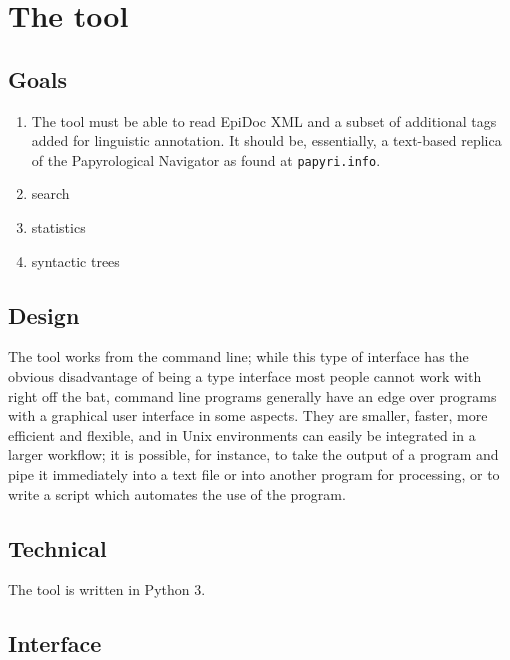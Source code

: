 \chapter{The tool}
\label{chp:design}
\minitoc\mtcskip
\section{Goals} %
\label{sec:tool-goals}


\begin{enumerate} 
  \item The tool must be able to read EpiDoc XML and a subset of
      additional tags added for linguistic annotation. It should be,
      essentially, a text-based replica of the Papyrological Navigator as found
      at \texttt{papyri.info}. 
    \item search 
    \item statistics
    \item syntactic trees
\end{enumerate}

\section{Design} %

The tool works from the command line; while this type of interface has the
obvious disadvantage of being a type interface most people cannot work with
right off the bat, command line programs generally have an edge over programs
with a graphical user interface in some aspects. They are smaller, faster, more
efficient and flexible, and in Unix environments can easily be integrated in a
larger workflow; it is possible, for instance, to take the output of a program
and pipe it immediately into a text file or into another program for
processing, or to write a script which automates the use of the program.


\section{Technical} %
\label{sec:tool-technical}
The tool is written in Python 3. 

\section{Interface} %
\label{sec:interface}

